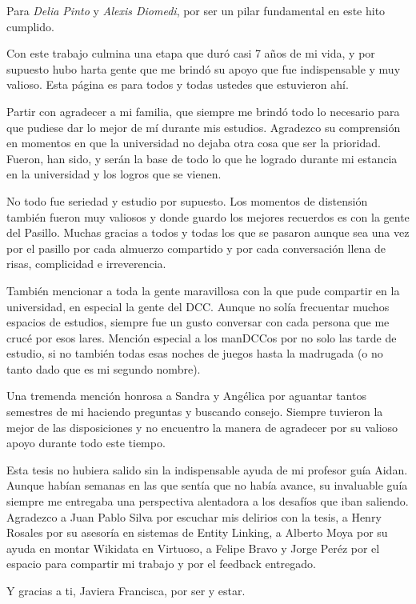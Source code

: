 \documentclass[upright, contnum]{umemoria}
\begin{document}
\begin{dedicatoria} %
Para \emph{Delia Pinto} y \emph{Alexis Diomedi}, por ser \break un pilar fundamental en este hito cumplido.
\end{dedicatoria}

\begin{thanks} %
Con este trabajo culmina una etapa que duró casi 7 años de mi vida, y por supuesto hubo harta gente 
que me brindó su apoyo que fue indispensable y muy valioso. Esta página es para todos y todas ustedes 
que estuvieron ahí. 

Partir con agradecer a mi familia, que siempre me brindó todo lo necesario para que pudiese dar lo 
mejor de mí durante mis estudios. Agradezco su comprensión en momentos en que la universidad no 
dejaba otra cosa que ser la prioridad. Fueron, han sido, y serán la base de todo lo que he logrado 
durante mi estancia en la universidad y los logros que se vienen.

No todo fue seriedad y estudio por supuesto. Los momentos de distensión también fueron muy valiosos y 
donde guardo los mejores recuerdos es con la gente del Pasillo. Muchas gracias a todos y todas los 
que se pasaron aunque sea una vez por el pasillo por cada almuerzo compartido y por cada conversación 
llena de risas, complicidad e irreverencia. 

También mencionar a toda la gente maravillosa con la que pude compartir en la universidad, en especial la 
gente del DCC. Aunque no solía frecuentar muchos espacios de estudios, siempre fue un gusto conversar con 
cada persona que me crucé por esos lares. Mención especial a los manDCCos por no solo las tarde de estudio, 
si no también todas esas noches de juegos hasta la madrugada (o no tanto dado que  
es mi segundo nombre).

Una tremenda mención honrosa a Sandra y Angélica por aguantar tantos semestres de mi haciendo preguntas 
y buscando consejo. Siempre tuvieron la mejor de las disposiciones y no encuentro la manera de agradecer
por su valioso apoyo durante todo este tiempo. 

Esta tesis no hubiera salido sin la indispensable ayuda de mi profesor guía Aidan. 
Aunque habían semanas en las que sentía que no había avance, su invaluable guía siempre me 
entregaba una perspectiva alentadora a los desafíos que iban saliendo. Agradezco a Juan Pablo Silva por 
escuchar mis delirios con la tesis, a Henry Rosales por su asesoría en sistemas de Entity Linking, a 
Alberto Moya por su ayuda en montar Wikidata en Virtuoso, a Felipe Bravo y Jorge Peréz 
por el espacio para compartir mi trabajo y por el feedback entregado. 

Y gracias a ti, Javiera Francisca, por ser y estar.
\end{thanks}
\end{document}
